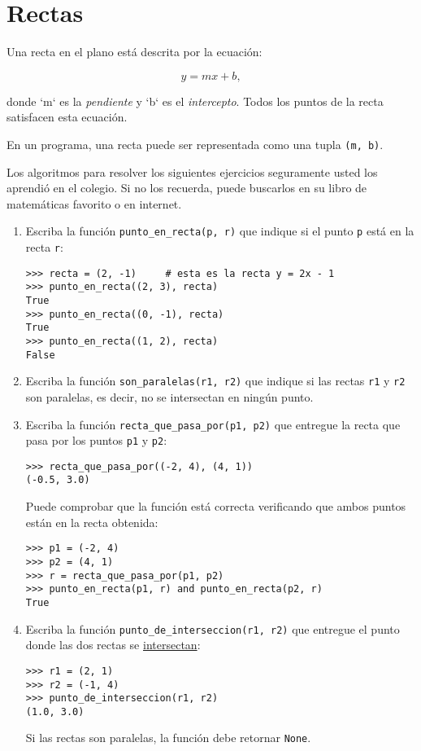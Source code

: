 \section{Rectas}

Una recta en el plano está descrita por la ecuación:

\[y = mx + b,\]

donde `m` es la \emph{pendiente} y `b` es el \emph{intercepto}. Todos
los puntos de la recta satisfacen esta ecuación.

En un programa, una recta puede ser representada como una tupla
\lstinline!(m, b)!.

Los algoritmos para resolver los siguientes ejercicios seguramente usted
los aprendió en el colegio. Si no los recuerda, puede buscarlos en su
libro de matemáticas favorito o en internet.

\begin{enumerate}
\item
  Escriba la función \lstinline!punto_en_recta(p, r)! que indique si el
  punto \lstinline!p! está en la recta \lstinline!r!:

\begin{lstlisting}
>>> recta = (2, -1)     # esta es la recta y = 2x - 1
>>> punto_en_recta((2, 3), recta)
True
>>> punto_en_recta((0, -1), recta)
True
>>> punto_en_recta((1, 2), recta)
False
\end{lstlisting}
\item
  Escriba la función \lstinline!son_paralelas(r1, r2)! que indique si
  las rectas \lstinline!r1! y \lstinline!r2! son paralelas, es decir, no
  se intersectan en ningún punto.
\item
  Escriba la función \lstinline!recta_que_pasa_por(p1, p2)! que entregue
  la recta que pasa por los puntos \lstinline!p1! y \lstinline!p2!:

\begin{lstlisting}
>>> recta_que_pasa_por((-2, 4), (4, 1))
(-0.5, 3.0)
\end{lstlisting}

  Puede comprobar que la función está correcta verificando que ambos
  puntos están en la recta obtenida:

\begin{lstlisting}
>>> p1 = (-2, 4)
>>> p2 = (4, 1)
>>> r = recta_que_pasa_por(p1, p2)
>>> punto_en_recta(p1, r) and punto_en_recta(p2, r)
True
\end{lstlisting}
\item
  Escriba la función \lstinline!punto_de_interseccion(r1, r2)! que
  entregue el punto donde las dos rectas se
  \href{http://www.mieres.uniovi.es/egi/dao/apuntes/planos\_y\_coordenadas.html}{intersectan}:

\begin{lstlisting}
>>> r1 = (2, 1)
>>> r2 = (-1, 4)
>>> punto_de_interseccion(r1, r2)
(1.0, 3.0)
\end{lstlisting}

  Si las rectas son paralelas, la función debe retornar
  \lstinline!None!.
\end{enumerate}
